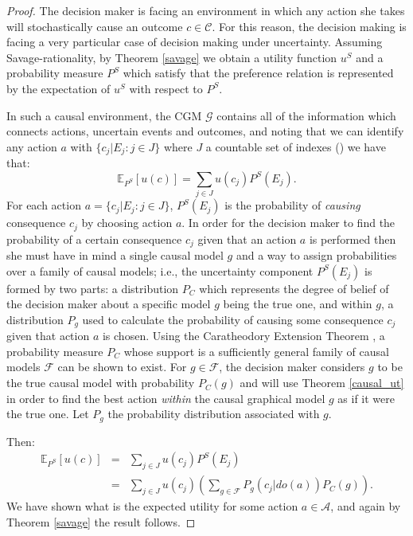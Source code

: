 \documentclass[review]{elsarticle}
\begin{document}
\begin{proof}
The decision maker is facing an environment in which any action she takes will stochastically cause an outcome $c \in \mathcal{C}$. For this reason, the decision making is facing a very particular case of decision making under uncertainty. Assuming Savage-rationality, by Theorem \ref{savage} we obtain a utility function $u^S$ and a probability measure $P^S$ which satisfy that the preference relation is represented by the expectation of $u^S$ with respect to $P^S$. 

In such a causal environment, the CGM $\mathcal{G}$ contains all of the information which connects actions, uncertain events and outcomes, and noting that we can identify any action $a$ with $\{ c_j | E_j : j \in J  \}$ where $J$ a countable set of indexes (\cite{bernardo2000bayesian}) we have that:
\[\mathbb{E}_{P^S}[u(c)] = \sum_{j \in J} u(c_j)P^S(E_j).\]
For each action $a=\{ c_j | E_j : j \in J \}$, $P^S(E_j)$ is the probability of \textit{causing} consequence $c_j$ by choosing action $a$. In order for the decision maker to find the probability of a certain consequence $c_j$ given that an action $a$ is performed then she must have in mind a single causal model $g$ and a way to assign probabilities over a family of causal models; i.e., the uncertainty component $P^S(E_j)$ is formed by two parts: a distribution $P_C$ which represents the degree of belief of the decision maker about a specific model $g$ being the true one, and within $g$, a distribution $P_g$ used to calculate the probability of causing some consequence $c_j$ given that action $a$ is chosen. Using the Caratheodory Extension Theorem \citep{ash2000probability}, a probability measure  $P_C$ whose support is a sufficiently general family of causal models $\mathcal{F}$ can be shown to exist. For $g \in \mathcal{F}$, the decision maker considers $g$ to be the true causal model with probability $P_C(g)$ and will use Theorem \ref{causal_ut} in order to find the best action \textit{within} the causal graphical model $g$ as if it were the true one. Let $P_g$ the probability distribution associated with $g$. 

Then:
\begin{eqnarray*}
\mathbb{E}_{P^S}[u(c)] &=& \sum_{j \in J} u(c_j)P^S(E_j)\\
                                      &=& \sum_{j \in J} u(c_j) \left( \sum_{g \in \mathcal{F}} P_g(c_j | do(a))P_C(g) \right).
\end{eqnarray*}
We have shown what is the expected utility for some action $a \in \mathcal{A}$, and again by Theorem \ref{savage} the result follows. 
\end{proof}
\end{document}
